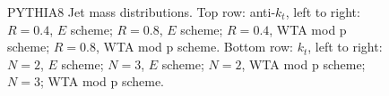 \begin{figure}[H]
\hfill
{}\hfill
\caption{PYTHIA8 Jet mass distributions. Top row: anti-$k_t$, left to right: $R=0.4$, $E$ scheme; $R=0.8$, $E$ scheme; $R=0.4$, WTA mod p scheme; $R=0.8$, WTA mod p scheme. Bottom row: $k_t$, left to right: $N=2$, $E$ scheme; $N=3$, $E$ scheme; $N=2$, WTA mod p scheme; $N=3$; WTA mod p scheme.}  
\end{figure}

